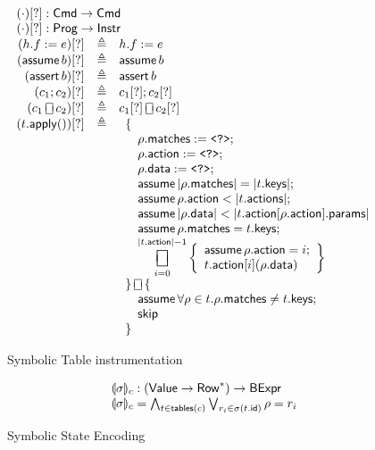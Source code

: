 \documentclass{article}
\newcommand{\Value}{\mathsf{Value}}
\newcommand{\BExpr}{\mathsf{BExpr}}
\newcommand{\Cmd}{\mathsf{Cmd}}
\newcommand{\Instr}{\mathsf{Instr}}
\newcommand{\Prog}{\mathsf{Prog}}
\newcommand{\Row}{\mathsf{Row}}
\newcommand{\matches}{\mathsf{matches}}
\newcommand{\action}{\mathsf{action}}
\newcommand{\actions}{\mathsf{actions}}
\newcommand{\keys}{\mathsf{keys}}
\newcommand{\data}{\mathsf{data}}
\newcommand{\params}{\mathsf{params}}
\newcommand{\id}{\mathsf{id}}
\newcommand{\assert}{\mathop{\mathsf{assert}}}
\newcommand{\assume}{\mathop{\mathsf{assume}}}
\newcommand{\apply}{\mathsf{apply}}
\newcommand{\choiceop}{\rotatebox[origin=c]{90}{$\sqsubset\!\!\!\sqsupset$}}
\newcommand{\choice}{\mathbin{\choiceop}}
\DeclareMathOperator*{\bigchoice}{\scalerel*{\choiceop}{\sum}}
\newcommand{\havoc}{\texttt{<?>}}
\newcommand{\SKIP}{\mathsf{skip}}
\newcommand{\state}[1]{\llparenthesis#1\rrparenthesis}
\newcommand{\tables}{\mathop{\mathsf{tables}}}
\begin{document}
\begin{figure}[htp]
  \[\begin{array}{r >{\triangleq}cl}
  \multicolumn{3}{l}{(\cdot)[?] : \Cmd \to \Cmd} \\
  \multicolumn{3}{l}{(\cdot)[?] : \Prog \to \Instr} \\
  (h.f := e)[?] && h.f := e \\
  (\assume b)[?] && \assume b \\
  (\assert b)[?] && \assert b\\
  (c_1;c_2)[?] && c_1[?];c_2[?]\\
  (c_1 \choice c_2)[?] && c_1[?] \choice c_2[?]\\
  (t.\apply())[?] &&
  \begin{array}[t]{l} \displaystyle
    \{ \\
    \quad \rho.\matches := \havoc; \\
    \quad \rho.\action := \havoc;\\
    \quad \rho.\data := \havoc; \\
    \quad \assume |\rho.\matches| = |t.\keys|; \\
    \quad \assume \rho.\action < |t.\actions|; \\
    \quad \assume |\rho.\data| < |t.\action[\rho.\action].\params| \\
    \quad \assume \rho.\matches = t.\keys; \\
    \quad \displaystyle \bigchoice_{i=0}^{|t.\action| -1}
    \left\{\begin{array}{l}
    \assume \rho.\action = i;\\
    t.\action[i](\rho.\data)
    \end{array}\right\}\\
    \} \choice \{ \\
    \quad \assume \forall \rho \in t. \rho.\matches \neq t.\keys; \\
    \quad \SKIP \\
    \}
  \end{array}
  \end{array}
  \]
  \caption{Symbolic Table instrumentation}
  \label{fig:table-instrument}
\end{figure}

\begin{figure}[htp]
  \[\begin{array}{r >{\triangleq}cl}
  \multicolumn{3}{l}{\state\sigma_c : (\Value \to \Row^*) \to \BExpr} \\
  \state\sigma_c = \bigwedge_{ t \in \tables(c) } \bigvee_{r_i \in \sigma(t.\id)}
  \rho = r_i
  \end{array}
  \]
  \caption{Symbolic State Encoding}
  \label{fig:table-instrument}
\end{figure}
\end{document}
